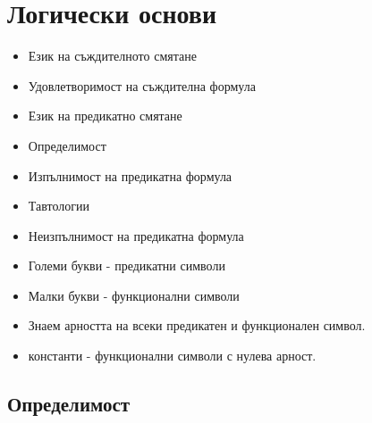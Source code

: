 \chapter{Логически основи}


\begin{itemize}
\item
  Език на съждителното смятане
\item
  Удовлетворимост на съждителна формула
\item
  Език на предикатно смятане
\item
  Определимост
\item
  Изпълнимост на предикатна формула
\item
  Тавтологии
\item
  Неизпълнимост на предикатна формула
\end{itemize}

\begin{itemize}
\item
  Големи букви - предикатни символи
\item
  Малки букви - функционални символи
\item
  Знаем арността на всеки предикатен и функционален символ.
\item
  константи - функционални символи с нулева арност.
\end{itemize}

\section{Определимост}




